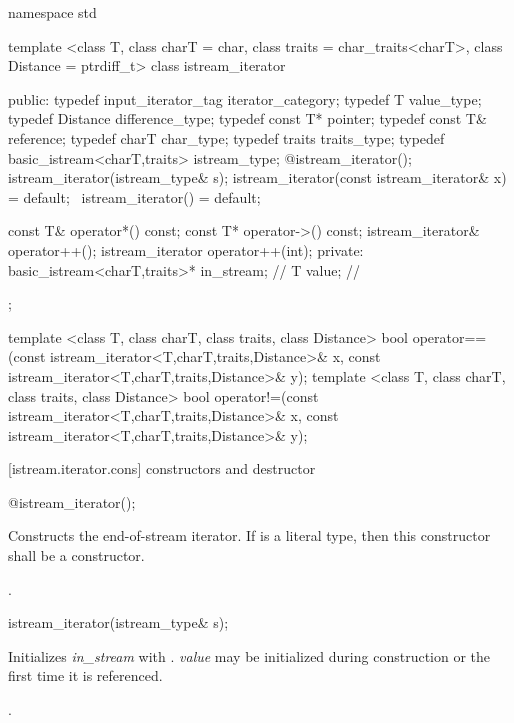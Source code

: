 \begin{codeblock}
namespace std {
  template <class T, class charT = char, class traits = char_traits<charT>,
      class Distance = ptrdiff_t>
  class istream_iterator {
  public:
    typedef input_iterator_tag iterator_category;
    typedef T value_type;
    typedef Distance difference_type;
    typedef const T* pointer;
    typedef const T& reference;
    typedef charT char_type;
    typedef traits traits_type;
    typedef basic_istream<charT,traits> istream_type;
    @\seebelow@ istream_iterator();
    istream_iterator(istream_type& s);
    istream_iterator(const istream_iterator& x) = default;
   ~istream_iterator() = default;

    const T& operator*() const;
    const T* operator->() const;
    istream_iterator& operator++();
    istream_iterator  operator++(int);
  private:
    basic_istream<charT,traits>* in_stream; // \expos
    T value;                                // \expos
  };

  template <class T, class charT, class traits, class Distance>
    bool operator==(const istream_iterator<T,charT,traits,Distance>& x,
            const istream_iterator<T,charT,traits,Distance>& y);
  template <class T, class charT, class traits, class Distance>
    bool operator!=(const istream_iterator<T,charT,traits,Distance>& x,
            const istream_iterator<T,charT,traits,Distance>& y);
}
\end{codeblock}

[istream.iterator.cons]{ constructors and destructor}


%
\begin{itemdecl}
@\seebelow@ istream_iterator();
\end{itemdecl}

\begin{itemdescr}
\pnum
\effects
Constructs the end-of-stream iterator. If  is a literal type, then this
constructor shall be a  constructor.

\pnum
\postcondition {}.
\end{itemdescr}


%
\begin{itemdecl}
istream_iterator(istream_type& s);
\end{itemdecl}

\begin{itemdescr}
\pnum
\effects
Initializes \textit{in_stream} with . \textit{value} may be initialized during
construction or the first time it is referenced.

\pnum
\postcondition {}.
\end{itemdescr}


